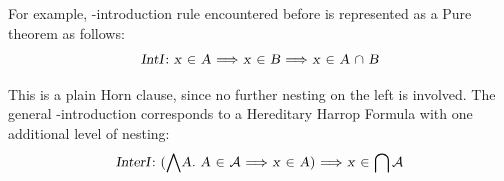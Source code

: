 \begin{isabellebody}
\begin{isamarkuptext}
  For example, -introduction rule encountered before is
  represented as a Pure theorem as follows:
  \[
  \isa{{\isaliteral{22}{\isachardoublequote}}IntI{\isaliteral{3A}{\isacharcolon}}{\isaliteral{22}{\isachardoublequote}}}~\isa{{\isaliteral{22}{\isachardoublequote}}x\ {\isaliteral{5C3C696E3E}{\isasymin}}\ A\ {\isaliteral{5C3C4C6F6E6772696768746172726F773E}{\isasymLongrightarrow}}\ x\ {\isaliteral{5C3C696E3E}{\isasymin}}\ B\ {\isaliteral{5C3C4C6F6E6772696768746172726F773E}{\isasymLongrightarrow}}\ x\ {\isaliteral{5C3C696E3E}{\isasymin}}\ A\ {\isaliteral{5C3C696E7465723E}{\isasyminter}}\ B{\isaliteral{22}{\isachardoublequote}}}
  \]

  \noindent This is a plain Horn clause, since no further nesting on
  the left is involved.  The general -introduction
  corresponds to a Hereditary Harrop Formula with one additional level
  of nesting:
  \[
  \isa{{\isaliteral{22}{\isachardoublequote}}InterI{\isaliteral{3A}{\isacharcolon}}{\isaliteral{22}{\isachardoublequote}}}~\isa{{\isaliteral{22}{\isachardoublequote}}{\isaliteral{28}{\isacharparenleft}}{\isaliteral{5C3C416E643E}{\isasymAnd}}A{\isaliteral{2E}{\isachardot}}\ A\ {\isaliteral{5C3C696E3E}{\isasymin}}\ {\isaliteral{5C3C413E}{\isasymA}}\ {\isaliteral{5C3C4C6F6E6772696768746172726F773E}{\isasymLongrightarrow}}\ x\ {\isaliteral{5C3C696E3E}{\isasymin}}\ A{\isaliteral{29}{\isacharparenright}}\ {\isaliteral{5C3C4C6F6E6772696768746172726F773E}{\isasymLongrightarrow}}\ x\ {\isaliteral{5C3C696E3E}{\isasymin}}\ {\isaliteral{5C3C496E7465723E}{\isasymInter}}{\isaliteral{5C3C413E}{\isasymA}}{\isaliteral{22}{\isachardoublequote}}}
  \]


\end{isamarkuptext}
\end{isabellebody}

